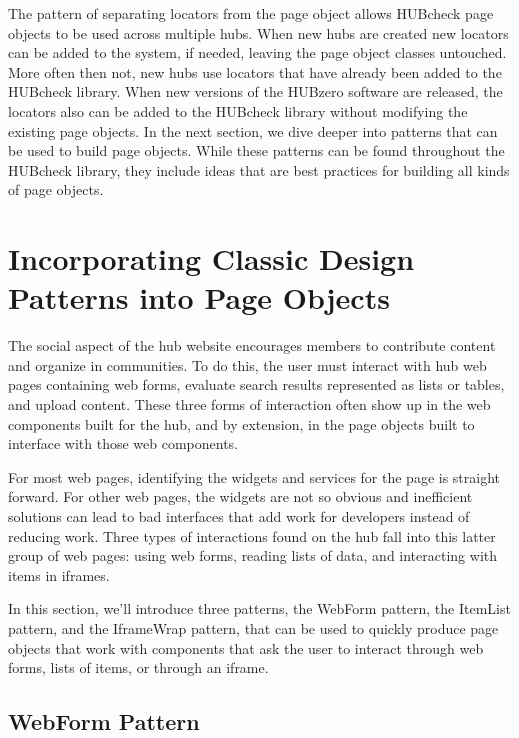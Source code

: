 The pattern of separating locators from the page object allows HUBcheck page
objects to be used across multiple hubs. When new hubs are created new locators
can be added to the system, if needed, leaving the page object classes
untouched. More often then not, new hubs use locators that have already been
added to the HUBcheck library.  When new versions of the HUBzero software are
released, the locators also can be added to the HUBcheck library without
modifying the existing page objects. In the next section, we dive deeper into
patterns that can be used to build page objects. While these patterns can be
found throughout the HUBcheck library, they include ideas that are best
practices for building all kinds of page objects.


\section{Incorporating Classic Design Patterns into Page Objects}
\label{sec:incorporate_design_patterns_into_page_objects}

The social aspect of the hub website encourages members to contribute content
and organize in communities. To do this, the user must interact with hub web
pages containing web forms, evaluate search results represented as lists or tables,
and upload content. These three forms of interaction often show up in the web
components built for the hub, and by extension, in the page objects built to
interface with those web components.

For most web pages, identifying the widgets and services for the page is
straight forward. For other web pages, the widgets are not so obvious and
inefficient solutions can lead to bad interfaces that add work for developers
instead of reducing work. Three types of interactions found on the hub fall
into this latter group of web pages: using web forms, reading lists
of data, and interacting with items in iframes.

In this section, we'll introduce three patterns, the WebForm pattern,
the ItemList pattern, and the IframeWrap pattern, that can be
used to quickly produce page objects that work with components that ask the
user to interact through web forms, lists of items, or through an iframe.


\subsection{WebForm Pattern}
\label{ssec:webform_pattern}

